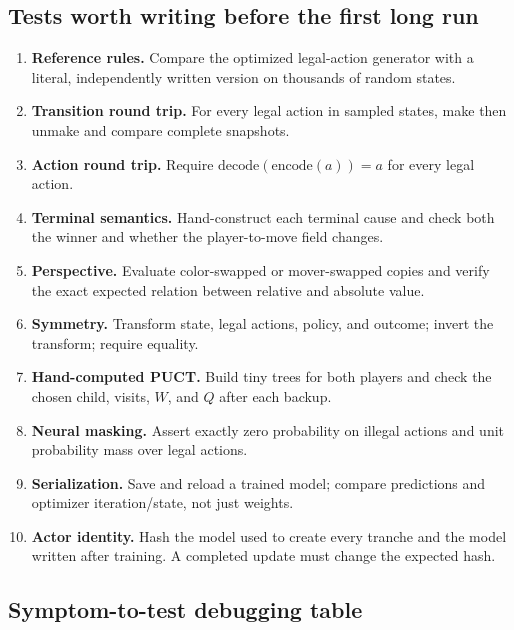 \documentclass[10.5pt,letterpaper]{article}
\begin{document}
\subsection{Tests worth writing before the first long run}
\begin{enumerate}
  \item \textbf{Reference rules.} Compare the optimized legal-action generator
        with a literal, independently written version on thousands of random
        states.
  \item \textbf{Transition round trip.} For every legal action in sampled
        states, make then unmake and compare complete snapshots.
  \item \textbf{Action round trip.} Require
        $\mathrm{decode}(\mathrm{encode}(a))=a$ for every legal action.
  \item \textbf{Terminal semantics.} Hand-construct each terminal cause and
        check both the winner and whether the player-to-move field changes.
  \item \textbf{Perspective.} Evaluate color-swapped or mover-swapped copies and
        verify the exact expected relation between relative and absolute value.
  \item \textbf{Symmetry.} Transform state, legal actions, policy, and outcome;
        invert the transform; require equality.
  \item \textbf{Hand-computed PUCT.} Build tiny trees for both players and check
        the chosen child, visits, $W$, and $Q$ after each backup.
  \item \textbf{Neural masking.} Assert exactly zero probability on illegal
        actions and unit probability mass over legal actions.
  \item \textbf{Serialization.} Save and reload a trained model; compare
        predictions and optimizer iteration/state, not just weights.
  \item \textbf{Actor identity.} Hash the model used to create every tranche and
        the model written after training. A completed update must change the
        expected hash.
\end{enumerate}

\subsection{Symptom-to-test debugging table}
\end{document}
